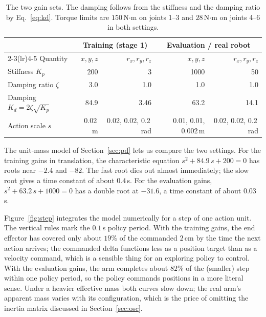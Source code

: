 \documentclass{article}
\newcommand{\Kp}{K_p}
\newcommand{\Kd}{K_d}
\begin{document}
\begin{table}[t]
\centering
\caption{The two gain sets. The damping follows from the stiffness and the damping ratio by Eq.~\eqref{eq:kd}. Torque limits are $150$\,N$\cdot$m on joints 1--3 and $28$\,N$\cdot$m on joints 4--6 in both settings.}
\label{tab:gains}
\small
\begin{tabular}{@{}lrrrr@{}}
\toprule
 & \multicolumn{2}{c}{Training (stage 1)} & \multicolumn{2}{c}{Evaluation / real robot}\\
\cmidrule(lr){2-3}\cmidrule(lr){4-5}
Quantity & $x,y,z$ & $r_x,r_y,r_z$ & $x,y,z$ & $r_x,r_y,r_z$\\
\midrule
Stiffness $\Kp$            & 200   & 3     & 1000  & 50\\
Damping ratio $\zeta$      & 3.0   & 1.0   & 1.0   & 1.0\\
Damping $\Kd=2\zeta\sqrt{\Kp}$ & 84.9 & 3.46 & 63.2 & 14.1\\
Action scale $s$           & 0.02\,m & 0.02, 0.02, 0.2\,rad & 0.01, 0.01, 0.002\,m & 0.02, 0.02, 0.2\,rad\\
\bottomrule
\end{tabular}
\end{table}

The unit-mass model of Section~\ref{sec:pd} lets us compare the two settings. For the training gains in translation, the characteristic equation $s^2+84.9\,s+200=0$ has roots near $-2.4$ and $-82$. The fast root dies out almost immediately; the slow root gives a time constant of about $0.4$\,s. For the evaluation gains, $s^2+63.2\,s+1000=0$ has a double root at $-31.6$, a time constant of about $0.03$\,s.

Figure~\ref{fig:step} integrates the model numerically for a step of one action unit. The vertical rules mark the $0.1$\,s policy period. With the training gains, the end effector has covered only about $19\%$ of the commanded $2$\,cm by the time the next action arrives; the commanded delta functions less as a position target than as a velocity command, which is a sensible thing for an exploring policy to control. With the evaluation gains, the arm completes about $82\%$ of the (smaller) step within one policy period, so the policy commands positions in a more literal sense. Under a heavier effective mass both curves slow down; the real arm's apparent mass varies with its configuration, which is the price of omitting the inertia matrix discussed in Section~\ref{sec:osc}.
\end{document}
